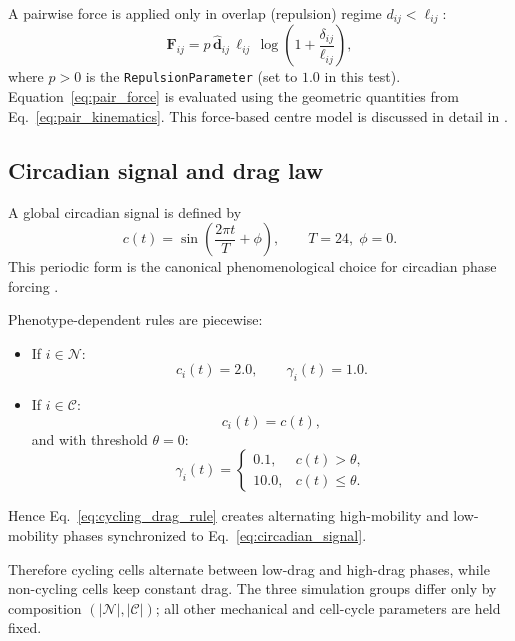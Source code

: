 \documentclass[11pt]{article}
\begin{document}
A pairwise force is applied only in overlap (repulsion) regime \(d_{ij}<\ell_{ij}\):
\begin{equation}
\mathbf{F}_{ij}=p\,\hat{\mathbf{d}}_{ij}\,\ell_{ij}\,\log\!\left(1+\frac{\delta_{ij}}{\ell_{ij}}\right),
\label{eq:pair_force}
\end{equation}
where \(p>0\) is the \texttt{RepulsionParameter} (set to \(1.0\) in this test).
Equation~\eqref{eq:pair_force} is evaluated using the geometric quantities from
Eq.~\eqref{eq:pair_kinematics}.
This force-based centre model is discussed in detail in
\cite{osborne2017comparing}.

\subsection{Circadian signal and drag law}
A global circadian signal is defined by
\begin{equation}
c(t)=\sin\!\left(\frac{2\pi t}{T}+\phi\right),
\qquad T=24,\;\phi=0.
\label{eq:circadian_signal}
\end{equation}
This periodic form is the canonical phenomenological choice for circadian phase
forcing \cite{takahashi2017}. 

Phenotype-dependent rules are piecewise:
\begin{itemize}
  \item If \(i\in\mathcal{N}\):
  \begin{equation}
  c_i(t)=2.0,\qquad \gamma_i(t)=1.0.
  \label{eq:noncycling_rule}
  \end{equation}
  \item If \(i\in\mathcal{C}\):
  \begin{equation}
  c_i(t)=c(t),
  \label{eq:cycling_circadian}
  \end{equation}
  and with threshold \(\theta=0\):
  \begin{equation}
  \gamma_i(t)=
  \begin{cases}
    0.1, & c(t)>\theta,\\
    10.0, & c(t)\le\theta.
  \end{cases}
  \label{eq:cycling_drag_rule}
  \end{equation}
\end{itemize}
Hence Eq.~\eqref{eq:cycling_drag_rule} creates alternating high-mobility and
low-mobility phases synchronized to Eq.~\eqref{eq:circadian_signal}.

Therefore cycling cells alternate between low-drag and high-drag phases,
while non-cycling cells keep constant drag. The three simulation groups differ
only by composition \((|\mathcal{N}|,|\mathcal{C}|)\); all other mechanical and
cell-cycle parameters are held fixed.
\end{document}
